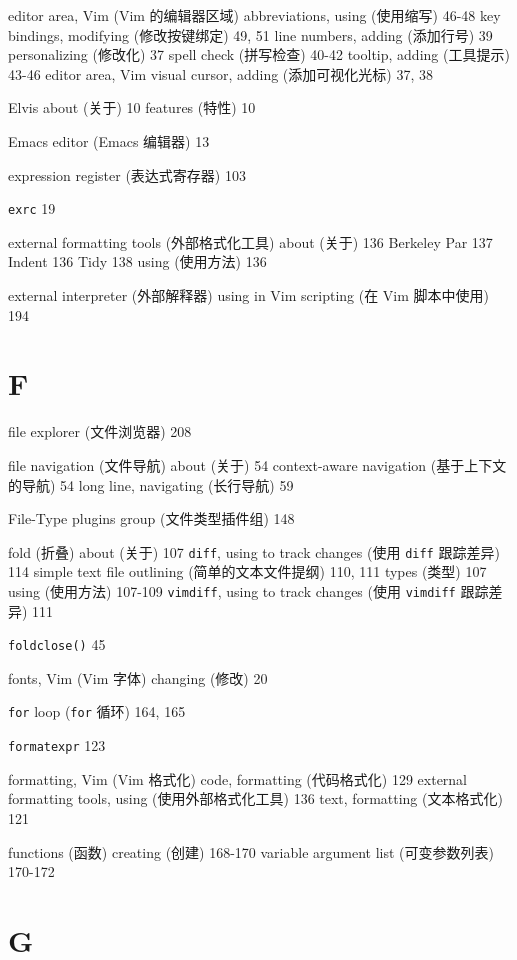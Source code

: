 editor area, Vim (Vim 的编辑器区域)
  abbreviations, using (使用缩写) 46-48
  key bindings, modifying (修改按键绑定) 49, 51
  line numbers, adding (添加行号) 39
  personalizing (修改化) 37
  spell check (拼写检查) 40-42
  tooltip, adding (工具提示) 43-46
  editor area, Vim visual cursor, adding (添加可视化光标) 37, 38

Elvis
  about (关于) 10
  features (特性) 10

Emacs editor (Emacs 编辑器) 13

expression register (表达式寄存器) 103

\texttt{exrc} 19

external formatting tools (外部格式化工具)
  about (关于) 136
  Berkeley Par 137
  Indent 136
  Tidy 138
  using (使用方法) 136

external interpreter (外部解释器)
  using in Vim scripting (在 Vim 脚本中使用) 194

\section{F}

file explorer (文件浏览器) 208

file navigation (文件导航)
  about (关于) 54
  context-aware navigation (基于上下文的导航) 54
  long line, navigating (长行导航) 59

File-Type plugins group (文件类型插件组) 148

fold (折叠)
  about (关于) 107
  \texttt{diff}, using to track changes (使用 \texttt{diff} 跟踪差异) 114
  simple text file outlining (简单的文本文件提纲) 110, 111
  types (类型) 107
  using (使用方法) 107-109
  \texttt{vimdiff}, using to track changes (使用 \texttt{vimdiff} 跟踪差异) 111

\texttt{foldclose()} 45

fonts, Vim (Vim 字体)
  changing (修改) 20

\texttt{for} loop (\texttt{for} 循环) 164, 165

\texttt{formatexpr} 123

formatting, Vim (Vim 格式化)
  code, formatting (代码格式化) 129
  external formatting tools, using (使用外部格式化工具) 136
  text, formatting (文本格式化) 121

functions (函数)
  creating (创建) 168-170
  variable argument list (可变参数列表) 170-172

\section{G}

